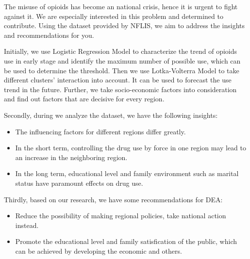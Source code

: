 \documentclass[12pt]{article}
\begin{document}
 The misuse of opioids has become an national crisis, hence it is urgent to fight against it. We are especially interested in this problem and determined to contribute. Using the dataset provided by NFLIS, we aim to address the insights and recommendations for you.
 
 Initially, we use Logistic Regression Model to characterize the trend of opioids use in early stage and identify the maximum number of possible use, which can be used to determine the threshold. Then we use Lotka-Volterra Model to take different clusters' interaction into account. It can be used to forecast the use trend in the future. Further, we take socio-economic factors into consideration and find out factors that are decisive for every region.
 
 Secondly, during we analyze the dataset, we have the following insights:
 \begin{itemize}
	 \item The influencing factors for different regions differ greatly.
	 \item In the short term, controlling the drug use by force in one region may lead to an increase in the neighboring region.
	 \item In the long term, educational level and family environment such as marital status have paramount effects on drug use.
 \end{itemize}

 Thirdly, based on our research, we have some recommendations for DEA:
 \begin{itemize}
	 \item Reduce the possibility of making regional policies, take national action instead.
	 \item Promote the educational level and family satisfication of the public, which can be achieved by developing the economic and others.
 \end{itemize}
 \newpage
\end{document}
